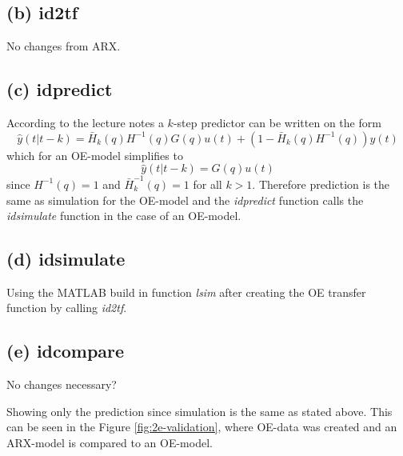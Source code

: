 \documentclass[]{article}
\begin{document}
\subsection{(b) id2tf}
No changes from ARX.

\subsection{(c) idpredict}
According to the lecture notes a $k$-step predictor can be written on the form
\begin{equation}
	\label{eq:K-step Prediction}
	\hat{y}(t|t-k) = \bar{H}_k(q)H^{-1}(q)G(q)u(t) + (1-\bar{H}_k(q)H^{-1}(q))y(t)
\end{equation}
which for an OE-model simplifies to
\begin{equation}
	\label{eq:K-step Prediction OE}
	\hat{y}(t|t-k) = G(q)u(t)
\end{equation}
since $H^{-1}(q)=1$ and $\bar{H}_k^{-1}(q)=1$ for all $k > 1$. Therefore prediction is the same as simulation for the OE-model and the \emph{idpredict} function calls the \emph{idsimulate} function in the case of an OE-model.

\subsection{(d) idsimulate}
Using the MATLAB build in function \emph{lsim} after creating the OE transfer function by calling \emph{id2tf}.

\subsection{(e) idcompare}
No changes necessary? 

Showing only the prediction since simulation is the same as stated above. This can be seen in the Figure \ref{fig:2e-validation}, where OE-data was created and an ARX-model is compared to an OE-model.
\end{document}
